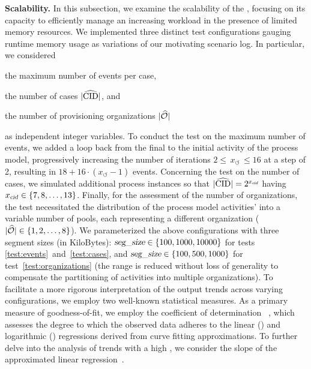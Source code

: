 \noindent\textbf{Scalability.}
In this subsection, we examine the scalability of the , focusing on its capacity to efficiently manage an increasing workload in the presence of limited memory resources. We implemented three distinct test configurations gauging runtime memory usage as variations of our motivating scenario log. In particular, we considered
\begin{inparaenum}[(I)]
	\item\label{test:events} the maximum number of events per case,
	\item\label{test:cases} the number of cases $|{\widehat{\mathrm{CID}}}|$, and 
	\item\label{test:organizations} the number of provisioning organizations $|{\widehat{\mathcal{O}}}|$
\end{inparaenum}
as independent integer variables. To conduct the test on the maximum number of events, we added a loop back from the final to the initial activity of the process model, progressively increasing the number of iterations $2 \leqslant \,x_\circlearrowleft\, \leqslant 16$ at a step of \num{2}, resulting in $18+16\cdot(x_\circlearrowleft-1)$ events. Concerning the test on the number of cases, we simulated additional process instances so that $|{\widehat{\mathrm{CID}}}| = 2^{x_{\textrm{\textsl{cid}}}}$ having $x_{\textrm{\textsl{cid}}} \in \{7,8,\ldots,13\}$. Finally, for the assessment of the number of organizations, the test necessitated the distribution of the process model activities' into a variable number of pools, each representing a different organization ($|{\widehat{\mathcal{O}}}| \in \{1,2,\ldots,8\}$).
%
We parameterized the above configurations with three segment sizes (in KiloBytes): $\textsl{seg\_size} \in \{100,1000,10000\}$ for tests \ref{test:events}~and~\ref{test:cases}, and $\textsl{seg\_size} \in \{100,500,1000\}$ for test~\ref{test:organizations} (the range is reduced without loss of generality to compensate the partitioning of activities into multiple organizations). To facilitate a more rigorous interpretation of the output trends across varying {\SegSize} configurations, we employ 
two well-known statistical measures. As a primary measure of goodness-of-fit, we employ the coefficient of determination {\RCoefficent}~\cite{barrett1974coefficient}, which assesses the degree to which the observed data adheres to the linear ({\Rlin}) and logarithmic ({\Rlog}) regressions derived from curve fitting approximations. To further delve into the analysis of trends with a high {\Rlin}, we consider the slope {\Slope} of the approximated linear regression~\cite{altman2015simplelinearregression}. 
